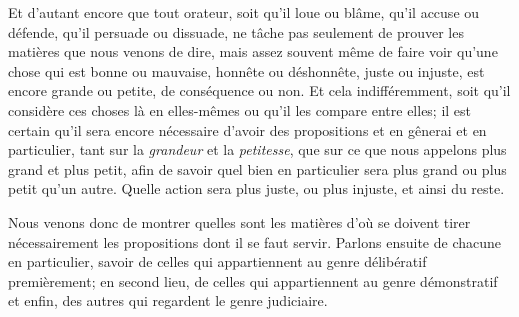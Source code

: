 \bigbreak

Et d'autant encore que tout orateur, soit qu'il loue ou blâme, qu'il accuse ou défende, qu'il persuade ou dissuade, ne tâche
pas seulement de prouver les matières que nous venons de dire, mais assez souvent même de faire voir qu'une chose qui est bonne
ou mauvaise, honnête ou déshonnête, juste ou injuste, est encore grande ou petite, de conséquence ou non. Et cela indifféremment,
soit qu'il considère ces choses là en elles-mêmes ou qu'il les compare entre elles; il est certain qu'il sera encore nécessaire
d'avoir des propositions et en gênerai et en particulier, tant sur la \emph{grandeur} et la \emph{petitesse}, que sur ce que nous
appelons plus grand et plus petit, afin de savoir quel bien en particulier sera plus grand ou plus petit qu'un autre. Quelle
action sera plus juste, ou plus injuste, et ainsi du reste. 

Nous venons donc de montrer quelles sont les matières d'où se doivent tirer nécessairement les propositions dont il se faut servir.
Parlons ensuite de chacune en particulier, savoir de celles qui appartiennent au genre délibératif premièrement; en second lieu,
de celles qui appartiennent au genre démonstratif et enfin, des autres qui regardent le genre judiciaire. 

